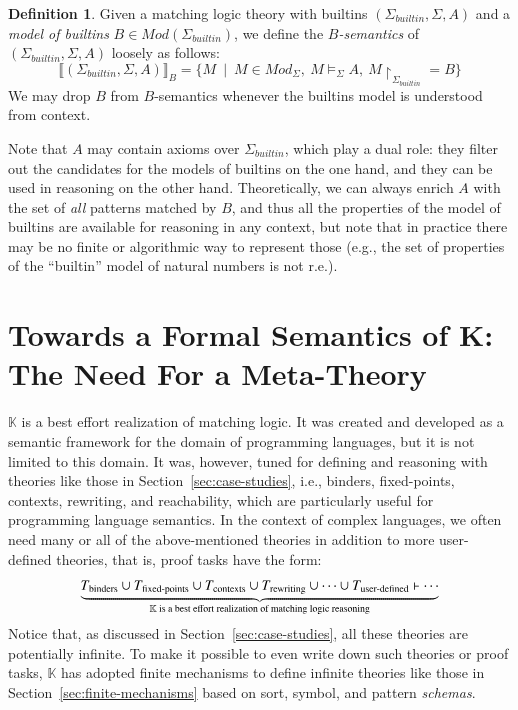 \documentclass[UTF8,11pt]{article}
\newcounter{thmcounter}
\theoremstyle{plain}
\theoremstyle{definition}
\newtheorem{definition} [thmcounter]{Definition}
\theoremstyle{remark}
\newcommand{\K}{\mbox{$\mathbb{K}$}\xspace}
\newcommand{\Mod}{\textit{Mod}}
\newcommand{\denote}[1]{\llbracket{#1}\rrbracket}
\newcommand{\reduct}[2]{\mbox{${#1}\!\!\upharpoonright_{#2}$}}
\newcommand{\builtin}{\textit{builtin}}
\begin{document}
\begin{definition}
Given a matching logic theory with builtins $(\Sigma_\builtin,\Sigma,A)$ and
a \emph{model of builtins} $B \in \Mod(\Sigma_\builtin)$, we define
the \emph{$B$-semantics} of $(\Sigma_\builtin,\Sigma,A)$ loosely as follows:
$$
\denote{(\Sigma_\builtin,\Sigma,A)}_B =
\{M \ \mid \ M \in \Mod_{\Sigma},\ M \models_{\Sigma} A,\ \reduct{M}{\Sigma_\builtin} = B \}
$$
We may drop $B$ from $B$-semantics whenever the builtins model is
understood from context.
\end{definition}

Note that $A$ may contain axioms over $\Sigma_\builtin$, which play a dual
role: they filter out the candidates for the models of builtins on the one
hand, and they can be used in reasoning on the other hand.
Theoretically, we can always enrich $A$ with the set of \emph{all} patterns
matched by $B$, and thus all the properties of the model of builtins are
available for reasoning in any context, but note that in practice there may
be no finite or algorithmic way to represent those
(e.g., the set of properties of the ``builtin'' model of natural numbers is
not r.e.).

\section{Towards a Formal Semantics of K: The Need For a Meta-Theory}
\label{sec:meta-theory-reflection}

{\K} is a best effort realization of matching logic.
It was created and developed as a semantic framework for the domain
of programming languages, but it is not limited to this domain.
It was, however, tuned for defining and reasoning with theories like
those in Section~\ref{sec:case-studies}, i.e.,
binders, fixed-points, contexts, rewriting, and reachability, which
are particularly useful for programming language semantics.
In the context of complex languages, we often need many or all of the
above-mentioned theories in addition to more user-defined theories, that is,
proof tasks have the form:
$$
\underbrace{T_\textrm{binders} \cup
T_\textrm{fixed-points} \cup
T_\textrm{contexts} \cup
T_\textrm{rewriting} \cup
\cdots \cup
T_\textrm{user-defined} \vdash \cdots}_
\text{\K is a best effort realization of matching logic reasoning}
$$
Notice that, as discussed in Section~\ref{sec:case-studies}, all these
theories are potentially infinite.
To make it possible to even write down such theories or proof tasks,
\K has adopted finite mechanisms to define infinite theories like those in
Section~\ref{sec:finite-mechanisms} based on sort, symbol, and
pattern \emph{schemas}.
\end{document}

